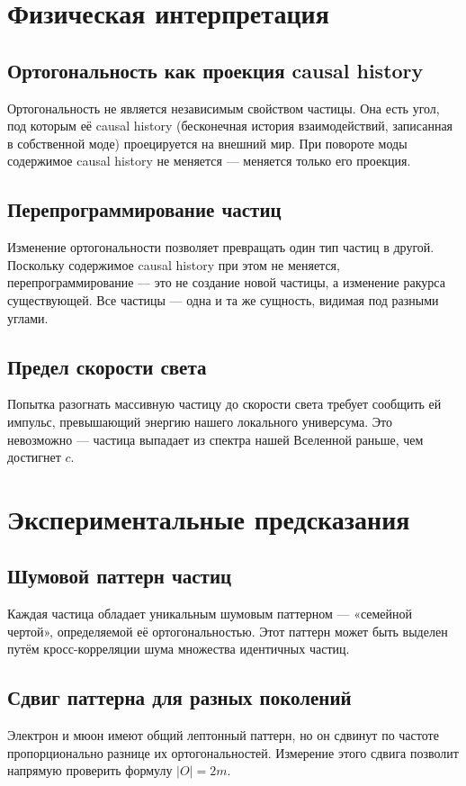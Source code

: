 \documentclass[12pt,a4paper]{article}
\begin{document}
\section{Физическая интерпретация}

\subsection{Ортогональность как проекция causal history}
Ортогональность не является независимым свойством частицы. Она есть угол, под которым её causal history (бесконечная история взаимодействий, записанная в собственной моде) проецируется на внешний мир. При повороте моды содержимое causal history не меняется --- меняется только его проекция.

\subsection{Перепрограммирование частиц}
Изменение ортогональности позволяет превращать один тип частиц в другой. Поскольку содержимое causal history при этом не меняется, перепрограммирование --- это не создание новой частицы, а изменение ракурса существующей. Все частицы --- одна и та же сущность, видимая под разными углами.

\subsection{Предел скорости света}
Попытка разогнать массивную частицу до скорости света требует сообщить ей импульс, превышающий энергию нашего локального универсума. Это невозможно --- частица выпадает из спектра нашей Вселенной раньше, чем достигнет $c$.

\section{Экспериментальные предсказания}

\subsection{Шумовой паттерн частиц}
Каждая частица обладает уникальным шумовым паттерном --- «семейной чертой», определяемой её ортогональностью. Этот паттерн может быть выделен путём кросс-корреляции шума множества идентичных частиц.

\subsection{Сдвиг паттерна для разных поколений}
Электрон и мюон имеют общий лептонный паттерн, но он сдвинут по частоте пропорционально разнице их ортогональностей. Измерение этого сдвига позволит напрямую проверить формулу $|O| = 2m$.
\end{document}
